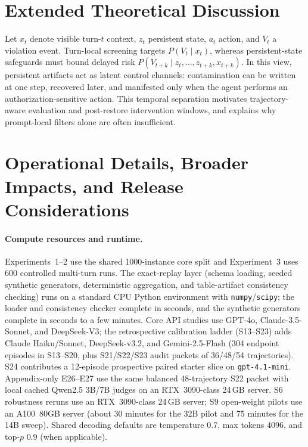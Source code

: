 \section{Extended Theoretical Discussion}
\label{app:theory_discussion}

Let $x_t$ denote visible turn-$t$ context, $z_t$ persistent state, $a_t$ action, and $V_t$ a violation event. Turn-local screening targets $P(V_t \mid x_t)$, whereas persistent-state safeguards must bound delayed risk $P(V_{t+k} \mid z_t,\ldots,z_{t+k},x_{t+k})$. In this view, persistent artifacts act as latent control channels: contamination can be written at one step, recovered later, and manifested only when the agent performs an authorization-sensitive action. This temporal separation motivates trajectory-aware evaluation and post-restore intervention windows, and explains why prompt-local filters alone are often insufficient.

\section{Operational Details, Broader Impacts, and Release Considerations}
\label{app:ops}

\paragraph{Compute resources and runtime.} Experiments~1--2 use the shared 1000-instance core split and Experiment~3 uses 600 controlled multi-turn runs. The exact-replay layer (schema loading, seeded synthetic generators, deterministic aggregation, and table-artifact consistency checking) runs on a standard CPU Python environment with \texttt{numpy}/\texttt{scipy}; the loader and consistency checker complete in seconds, and the synthetic generators complete in seconds to a few minutes. Core API studies use GPT-4o, Claude-3.5-Sonnet, and DeepSeek-V3; the retrospective calibration ladder (S13--S23) adds Claude Haiku/Sonnet, DeepSeek-v3.2, and Gemini-2.5-Flash (304 endpoint episodes in S13--S20, plus S21/S22/S23 audit packets of 36/48/54 trajectories). S24 contributes a 12-episode prospective paired starter slice on \texttt{gpt-4.1-mini}. Appendix-only E26--E27 use the same balanced 48-trajectory S22 packet with local cached Qwen2.5 3B/7B judges on an RTX~3090-class 24\,GB server. S6 robustness reruns use an RTX~3090-class 24\,GB server; S9 open-weight pilots use an A100~80GB server (about 30 minutes for the 32B pilot and 75 minutes for the 14B sweep). Shared decoding defaults are temperature $0.7$, max tokens $4096$, and top-$p$ $0.9$ (when applicable).

